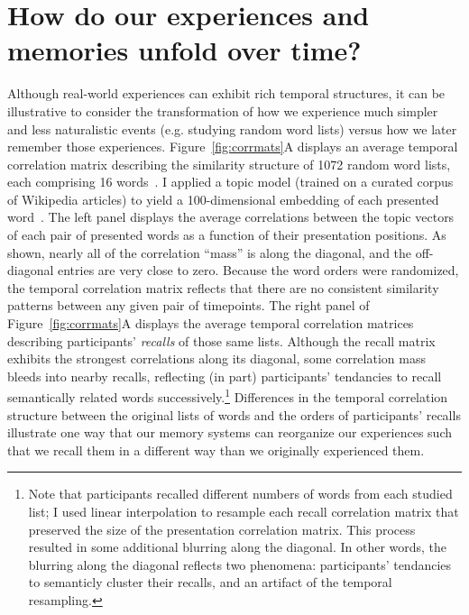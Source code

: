 \section*{How do our experiences and memories unfold over time?}
Although real-world experiences can exhibit rich temporal structures, it can be illustrative to consider the transformation of how we experience much simpler and less naturalistic events (e.g. studying random word lists) versus how we later remember those experiences.  Figure~\ref{fig:corrmats}A displays an average temporal correlation matrix describing the similarity structure of 1072 random word lists, each comprising 16 words~\citep{ZimaEtal18}.  I applied a topic model (trained on a curated corpus of Wikipedia articles) to yield a 100-dimensional embedding of each presented word~\citep{BleiEtal03}.  The left panel displays the average correlations between the topic vectors of each pair of presented words as a function of their presentation positions.  As shown, nearly all of the correlation ``mass'' is along the diagonal, and the off-diagonal entries are very close to zero.  Because the word orders were randomized, the temporal correlation matrix reflects that there are no consistent similarity patterns between any given pair of timepoints.  The right panel of Figure~\ref{fig:corrmats}A displays the average temporal correlation matrices describing participants' \textit{recalls} of those same lists.  Although the recall matrix exhibits the strongest correlations along its diagonal, some correlation mass bleeds into nearby recalls, reflecting (in part) participants' tendancies to recall semantically related words successively.\footnote{Note that participants recalled different numbers of words from each studied list; I used linear interpolation to resample each recall correlation matrix that preserved the size of the presentation correlation matrix.  This process resulted in some additional blurring along the diagonal.  In other words, the blurring along the diagonal reflects two phenomena: participants' tendancies to semanticly cluster their recalls, and an artifact of the temporal resampling.}  Differences in the temporal correlation structure between the original lists of words and the orders of participants' recalls illustrate one way that our memory systems can reorganize our experiences such that we recall them in a different way than we originally experienced them.







